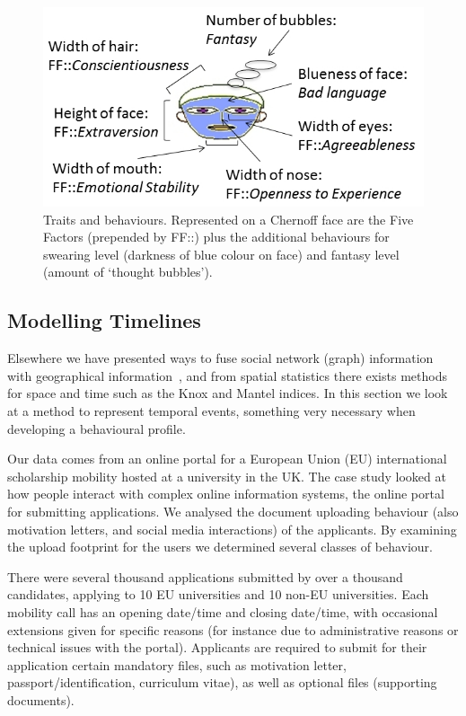 \documentclass{AISB2008}
\begin{document}
\begin{figure}[!htb]
\centering
\includegraphics[width=\columnwidth]{images/chernoffnew.jpg}
\caption{Traits and behaviours. Represented on a Chernoff face are the
  Five Factors (prepended by FF::) plus the additional behaviours for
  swearing level (darkness of blue colour on face) and fantasy level
  (amount of `thought bubbles').}
\label{fig:blueface}
\end{figure}


\subsection{Modelling Timelines}

Elsewhere we have presented ways to fuse social network (graph)
information with geographical
information~\cite{oatley-et-al:2006,oatley+howell:2013}, and from
spatial statistics there exists methods for space and time such as the
Knox and Mantel indices. In this section we look at a method to
represent temporal events, something very necessary when developing a
behavioural profile.

Our data comes from an online portal for a European Union (EU)
international scholarship mobility hosted at a university in the
UK. The case study looked at how people interact with complex online
information systems, the online portal for submitting applications. We
analysed the document uploading behaviour (also motivation letters,
and social media interactions) of the applicants. By examining the
upload footprint for the users we determined several classes of
behaviour.

There were several thousand applications submitted by over a thousand
candidates, applying to 10 EU universities and 10 non-EU
universities. Each mobility call has an opening date/time and closing
date/time, with occasional extensions given for specific reasons (for
instance due to administrative reasons or technical issues with the
portal). Applicants are required to submit for their application
certain mandatory files, such as motivation letter,
passport/identification, curriculum vitae), as well as optional files
(supporting documents).
\end{document}
